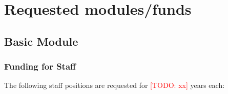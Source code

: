 \documentclass[american,firsttime]{dfgproposal}
\newcommand{\todo}[1]{\xspace{\textcolor{red}{[TODO: #1]}}\xspace}
\begin{document}
	\section{Requested modules/funds}
	
	\subsection{Basic Module}
	
	\subsubsection{Funding for Staff}
	\begin{funds}
		The following staff positions are requested for \todo{xx} years each:
		
	\end{funds}
	
	
\end{document}
